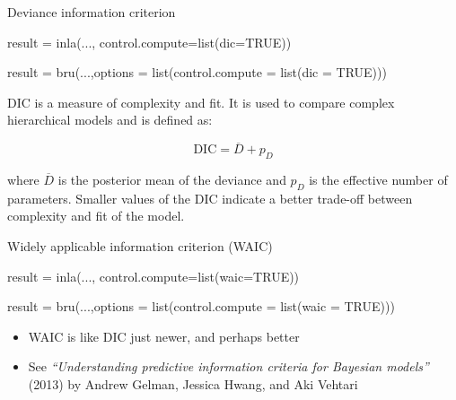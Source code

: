 \documentclass[
  ignorenonframetext,
  handout]{beamer}
\newenvironment{Shaded}{\begin{snugshade}}{\end{snugshade}}
\newcommand{\AttributeTok}[1]{\textcolor[rgb]{0.77,0.63,0.00}{#1}}
\newcommand{\ConstantTok}[1]{\textcolor[rgb]{0.00,0.00,0.00}{#1}}
\newcommand{\FunctionTok}[1]{\textcolor[rgb]{0.00,0.00,0.00}{#1}}
\newcommand{\NormalTok}[1]{#1}
\newcommand{\OtherTok}[1]{\textcolor[rgb]{0.56,0.35,0.01}{#1}}
\begin{document}
\begin{frame}[fragile]{Deviance information criterion}
\protect\hypertarget{deviance-information-criterion}{}
\small

\begin{Shaded}
\begin{Highlighting}[]
\NormalTok{result }\OtherTok{=} \FunctionTok{inla}\NormalTok{(...,}
              \AttributeTok{control.compute=}\FunctionTok{list}\NormalTok{(}\AttributeTok{dic=}\ConstantTok{TRUE}\NormalTok{))}

\NormalTok{result }\OtherTok{=} \FunctionTok{bru}\NormalTok{(...,}\AttributeTok{options =} \FunctionTok{list}\NormalTok{(}\AttributeTok{control.compute =} 
                                  \FunctionTok{list}\NormalTok{(}\AttributeTok{dic =} \ConstantTok{TRUE}\NormalTok{)))}
\end{Highlighting}
\end{Shaded}

\normalsize

\hfill\break
DIC is a measure of complexity and fit. It is used to compare complex
hierarchical models and is defined as:

\[
\text{DIC} = \overline{D} + p_D
\]

where \(\overline{D}\) is the posterior mean of the deviance and \(p_D\)
is the effective number of parameters. Smaller values of the DIC
indicate a better trade-off between complexity and fit of the model.
\end{frame}

\begin{frame}[fragile]{Widely applicable information criterion (WAIC)}
\protect\hypertarget{widely-applicable-information-criterion-waic}{}
\small

\begin{Shaded}
\begin{Highlighting}[]
\NormalTok{result }\OtherTok{=} \FunctionTok{inla}\NormalTok{(...,}
              \AttributeTok{control.compute=}\FunctionTok{list}\NormalTok{(}\AttributeTok{waic=}\ConstantTok{TRUE}\NormalTok{))}

\NormalTok{result }\OtherTok{=} \FunctionTok{bru}\NormalTok{(...,}\AttributeTok{options =} \FunctionTok{list}\NormalTok{(}\AttributeTok{control.compute =} 
                                  \FunctionTok{list}\NormalTok{(}\AttributeTok{waic =} \ConstantTok{TRUE}\NormalTok{)))}
\end{Highlighting}
\end{Shaded}

\normalsize

\begin{itemize}
\item
  WAIC is like DIC just newer, and perhaps better
\item
  See \emph{``Understanding predictive information criteria for Bayesian
  models''} (2013) by Andrew Gelman, Jessica Hwang, and Aki Vehtari
\end{itemize}
\end{frame}
\end{document}
